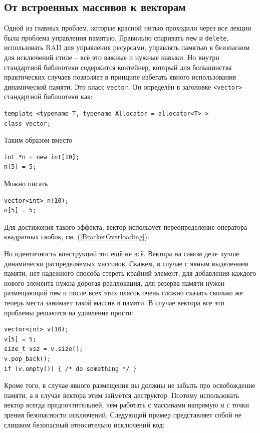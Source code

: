 \documentclass[a4paper,12pt,oneside]{book}
\begin{document}
\subsection{От встроенных массивов к векторам}\label{vectorarrs}

Одной из главных проблем, которые красной нитью проходили через все лекции была проблема управления памятью. Правильно спаривать \lstinline!new! и \lstinline!delete!, использовать RAII для управления ресурсами, управлять памятью в безопасном для исключений стиле -- всё это важные и нужные навыки. Но внутри стандартной библиотеки содержится контейнер, который для большинства практических случаев позволяет в принципе избегать явного использования динамической памяти. Это класс \lstinline!vector!. Он определён в заголовке \lstinline!<vector>! стандартной библиотеки как:

\begin{lstlisting}
template <typename T, typename Allocator = allocator<T> >
class vector;
\end{lstlisting}

Таким образом вместо

\begin{lstlisting}
int *n = new int[10];
n[5] = 5;
\end{lstlisting}

Можно писать

\begin{lstlisting}
vector<int> n(10);
n[5] = 5;
\end{lstlisting}

Для достижения такого эффекта, вектор использует переопределение оператора квадратных скобок, см. (\ref{BracketOverloading}).

Но идентичность конструкций это ещё не всё. Вектора на самом деле лучше динамически распределяемых массивов. Скажем, в случае с явным выделением памяти, нет надежного способа стереть крайний элемент, для добавления каждого нового элемента нужна дорогая реаллокация, для резерва памяти нужен размещающий \lstinline!new! и после всех этих плясок очень сложно сказать сколько же теперь места занимает такой массив в памяти. В случае вектора все эти проблемы решаются на удивление просто:

\begin{lstlisting}
vector<int> v(10);
v[5] = 5;
size_t vsz = v.size();
v.pop_back();
if (v.empty()) { /* do something */ }
\end{lstlisting}

Кроме того, в случае явного размещения вы должны не забыть про освобождение памяти, а в случае вектора этим займется деструктор. Поэтому использовать вектор всегда предпочтительней, чем работать с массивами напрямую и с точки зрения безопасности исключений. Следующий пример представляет собой не слишком безопасный относительно исключений код:
\end{document}
